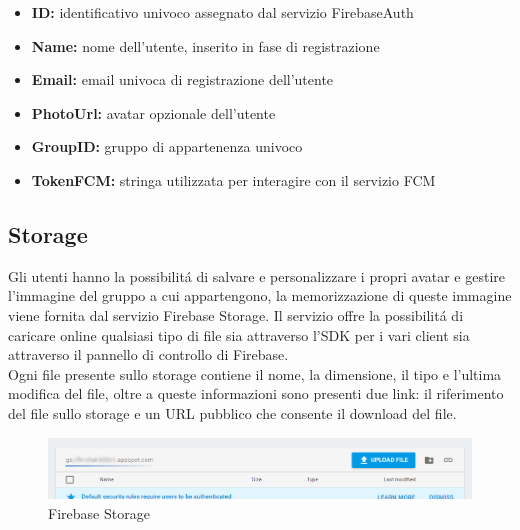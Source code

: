 \begin{itemize}
    \item \textbf{ID:}  identificativo univoco assegnato dal servizio FirebaseAuth
    \item \textbf{Name:} nome dell'utente, inserito in fase di registrazione
    \item \textbf{Email:} email univoca di registrazione dell'utente
    \item \textbf{PhotoUrl:} avatar opzionale dell'utente
    \item \textbf{GroupID:} gruppo di appartenenza univoco
    \item \textbf{TokenFCM:} stringa utilizzata per interagire con il servizio FCM
\end{itemize}

\newpage

\subsection{Storage}
Gli utenti hanno la possibilit\'a di salvare e personalizzare i propri avatar e gestire l'immagine del gruppo a cui appartengono, la memorizzazione di queste immagine viene fornita dal servizio Firebase Storage.
Il servizio offre la possibilit\'a di caricare online qualsiasi tipo di file sia attraverso l'SDK per i vari client sia attraverso il pannello di controllo di Firebase.\\
Ogni file presente sullo storage contiene il nome, la dimensione, il tipo e l'ultima modifica del file, oltre a queste informazioni sono presenti due link: il riferimento del file sullo storage e un URL pubblico che consente il download del file.

\begin{figure}[!hb]
  \centering
  \includegraphics[width=1\textwidth]{immagini/firebase_storage.png}
  \caption{Firebase Storage}\label{fig:Firebase Storage}
\end{figure}

